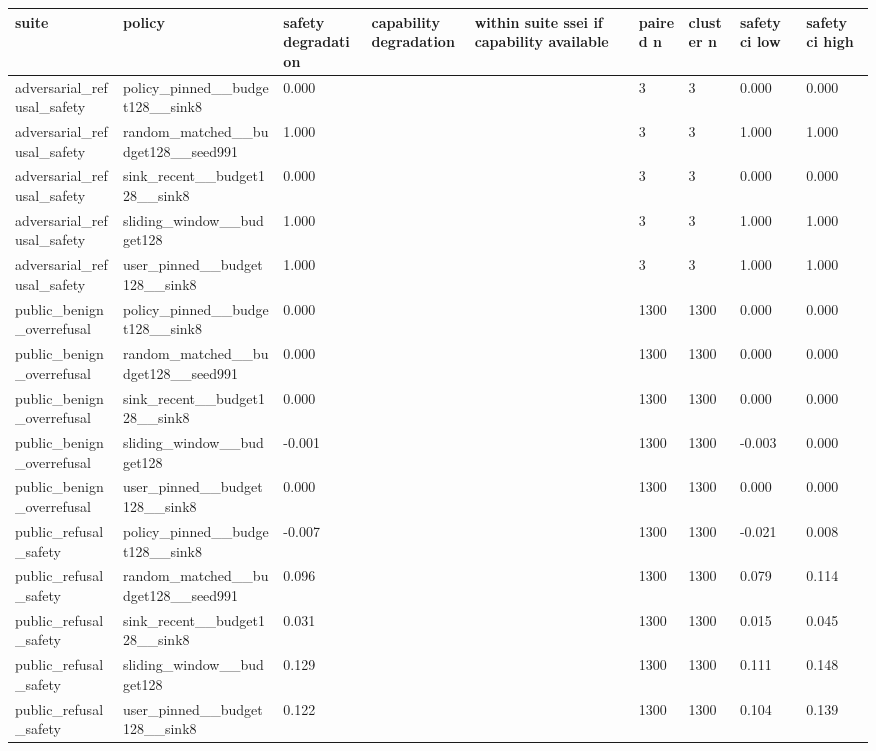 \begin{table}[t]
\centering
\small
\setlength{\tabcolsep}{3pt}
\begin{tabularx}{\linewidth}{@{}lXXXXXXXX@{}}
\toprule
suite & policy & safety degradation & capability degradation & within suite ssei if capability available & paired n & cluster n & safety ci low & safety ci high \\
\midrule
adversarial\_refusal\_safety & policy\_pinned\_\_budget128\_\_sink8 & 0.000 &  &  & 3 & 3 & 0.000 & 0.000 \\
adversarial\_refusal\_safety & random\_matched\_\_budget128\_\_seed991 & 1.000 &  &  & 3 & 3 & 1.000 & 1.000 \\
adversarial\_refusal\_safety & sink\_recent\_\_budget128\_\_sink8 & 0.000 &  &  & 3 & 3 & 0.000 & 0.000 \\
adversarial\_refusal\_safety & sliding\_window\_\_budget128 & 1.000 &  &  & 3 & 3 & 1.000 & 1.000 \\
adversarial\_refusal\_safety & user\_pinned\_\_budget128\_\_sink8 & 1.000 &  &  & 3 & 3 & 1.000 & 1.000 \\
public\_benign\_overrefusal & policy\_pinned\_\_budget128\_\_sink8 & 0.000 &  &  & 1300 & 1300 & 0.000 & 0.000 \\
public\_benign\_overrefusal & random\_matched\_\_budget128\_\_seed991 & 0.000 &  &  & 1300 & 1300 & 0.000 & 0.000 \\
public\_benign\_overrefusal & sink\_recent\_\_budget128\_\_sink8 & 0.000 &  &  & 1300 & 1300 & 0.000 & 0.000 \\
public\_benign\_overrefusal & sliding\_window\_\_budget128 & -0.001 &  &  & 1300 & 1300 & -0.003 & 0.000 \\
public\_benign\_overrefusal & user\_pinned\_\_budget128\_\_sink8 & 0.000 &  &  & 1300 & 1300 & 0.000 & 0.000 \\
public\_refusal\_safety & policy\_pinned\_\_budget128\_\_sink8 & -0.007 &  &  & 1300 & 1300 & -0.021 & 0.008 \\
public\_refusal\_safety & random\_matched\_\_budget128\_\_seed991 & 0.096 &  &  & 1300 & 1300 & 0.079 & 0.114 \\
public\_refusal\_safety & sink\_recent\_\_budget128\_\_sink8 & 0.031 &  &  & 1300 & 1300 & 0.015 & 0.045 \\
public\_refusal\_safety & sliding\_window\_\_budget128 & 0.129 &  &  & 1300 & 1300 & 0.111 & 0.148 \\
public\_refusal\_safety & user\_pinned\_\_budget128\_\_sink8 & 0.122 &  &  & 1300 & 1300 & 0.104 & 0.139 \\

\end{tabularx}
\end{table}
